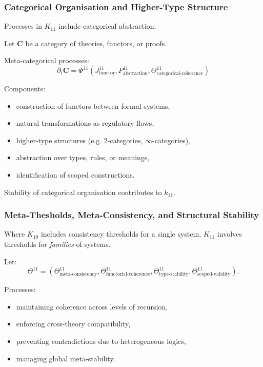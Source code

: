 \subsubsection{Categorical Organisation and Higher-Type Structure}

Processes in $K_{11}$ include categorical abstraction:

Let $\mathbf{C}$ be a category of theories, functors, or proofs.

Meta-categorical processes:
\[
\partial_t \mathbf{C} = 
\Phi^{11}(J^{11}_{\text{functor}}, 
          P^{11}_{\text{abstraction}}, 
          \Theta^{11}_{\text{categorical-coherence}})
\]

Components:
\begin{itemize}
    \item construction of functors between formal systems,
    \item natural transformations as regulatory flows,
    \item higher-type structures (e.g. 2-categories, $\infty$-categories),
    \item abstraction over types, rules, or meanings,
    \item identification of scoped constructions.
\end{itemize}

Stability of categorical organisation contributes to $k_{11}$.

\subsubsection{Meta-Thesholds, Meta-Consistency, and Structural Stability}

Where $K_{10}$ includes consistency thresholds for a single system,  
$K_{11}$ involves thresholds for \emph{families} of systems.

Let:
\[
\Theta^{11} = 
(\Theta^{11}_{\text{meta-consistency}},
 \Theta^{11}_{\text{functorial-coherence}},
 \Theta^{11}_{\text{type-stability}},
 \Theta^{11}_{\text{scoped-validity}}).
\]

Processes:
\begin{itemize}
    \item maintaining coherence across levels of recursion,
    \item enforcing cross-theory compatibility,
    \item preventing contradictions due to heterogeneous logics,
    \item managing global meta-stability.
\end{itemize}

